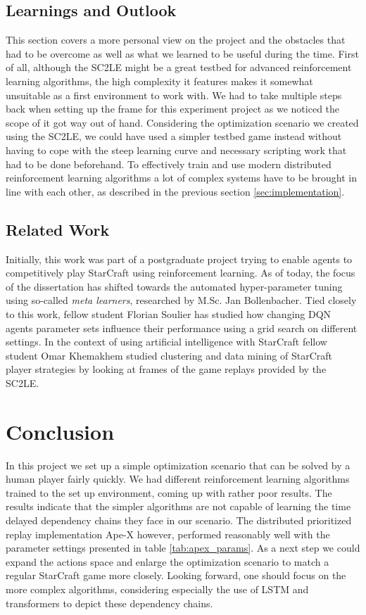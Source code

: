 \documentclass[12pt,a4paper]{article}
\begin{document}
\subsection{Learnings and Outlook}
This section covers a more personal view on the project and the obstacles that had to be overcome as well as what we learned to be useful during the time. First of all, although the SC2LE might be a great testbed for advanced reinforcement learning algorithms, the high complexity it features makes it somewhat unsuitable as a first environment to work with. We had to take multiple steps back when setting up the frame for this experiment project as we noticed the scope of it got way out of hand. Considering the optimization scenario we created using the SC2LE, we could have used a simpler testbed game instead without having to cope with the steep learning curve and necessary scripting work that had to be done beforehand. To effectively train and use modern distributed reinforcement learning algorithms a lot of complex systems have to be brought in line with each other, as described in the previous section \ref{sec:implementation}. 

\subsection{Related Work}
Initially, this work was part of a postgraduate project trying to enable agents to competitively play StarCraft using reinforcement learning. As of today, the focus of the dissertation has shifted towards the automated hyper-parameter tuning using so-called {\it meta learners}, researched by M.Sc. Jan Bollenbacher.
Tied closely to this work, fellow student Florian Soulier has studied how changing DQN agents parameter sets influence their performance using a grid search on different settings. In the context of using artificial intelligence with StarCraft fellow student Omar Khemakhem studied clustering and data mining of StarCraft player strategies by looking at frames of the game replays provided by the SC2LE. 
\section{Conclusion}
In this project we set up a simple optimization scenario that can be solved by a human player fairly quickly. We had different reinforcement learning algorithms trained to the set up environment, coming up with rather poor results. The results indicate that the simpler algorithms are not capable of learning the time delayed dependency chains they face in our scenario. The distributed prioritized replay implementation Ape-X however, performed reasonably well with the parameter settings presented in table \ref{tab:apex_params}. As a next step we could expand the actions space and enlarge the optimization scenario to match a regular StarCraft game more closely. Looking forward, one should focus on the more complex algorithms, considering especially the use of LSTM and transformers to depict these dependency chains.
\begin{appendix}
    \listoffigures
    \listoftables
    
\end{appendix}


\end{document}
